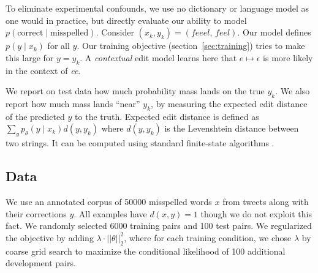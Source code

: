 \documentclass[11pt,letterpaper]{article}
\newcommand{\ptheta}{{p_\theta}}
\newcommand{\ryan}[1]{\todo[color=green!40,author=Ryan]{#1}}
\newcommand{\jason}[1]{\todo[color=blue!40,author=Jason]{#1}}
\begin{document}
To eliminate experimental confounds, we use no dictionary or language model as one would in practice, but directly evaluate our ability to model $p(\text{correct} \mid \text{misspelled})$.  
Consider $(x_k,y_k)=(\textit{feeel, feel})$.  Our model defines $p(y \mid x_k)$ for all $y$. Our training objective (section~\ref{sec:training}) tries to make this large for $y=y_k$.  
A {\em contextual} edit model 
learns here that $\textit{e} \mapsto \epsilon$ is more likely in the context of \textit{ee}.


We report on test data how much probability mass lands on the true $y_k$.  We also report
how much mass lands ``near'' $y_k$, by measuring the expected edit distance of the predicted $y$ to the truth.  Expected edit distance is defined as $\sum_y \ptheta(y\mid x_k) d(y,y_k)$ where  $d(y,y_k)$ is the Levenshtein distance between two strings.  It can be computed using standard finite-state algorithms \cite{mohri2003edit}.  

\vspace{-3pt}
\subsection{Data}
\vspace{-1pt}

We use an annotated corpus \cite{typocorpus} of 50000 misspelled words $x$ from tweets along with their corrections $y$.
All examples have $d(x,y)=1$ though we do not exploit this fact.
We randomly selected 6000 training pairs and 100 test pairs. We regularized the objective by adding $\lambda \cdot ||\theta||_2^2$, where for each training condition, we chose $\lambda$ by coarse grid search to maximize the conditional likelihood of 100 additional development pairs.
\end{document}
